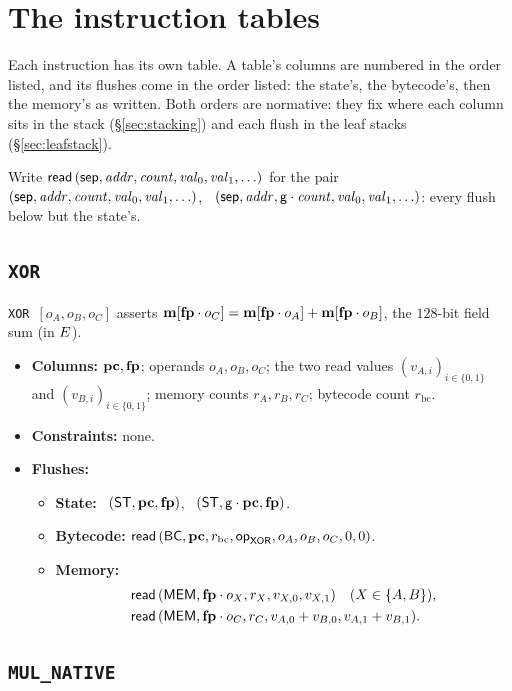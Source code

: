 \section{The instruction tables}\label{sec:tables}

Each instruction has its own table. A table's columns are numbered in the order listed, and its flushes come in the order listed: the state's, the bytecode's, then the memory's as written. Both orders are normative: they fix where each column sits in the stack (\S\ref{sec:stacking}) and each flush in the leaf stacks (\S\ref{sec:leafstack}).

Write $\rdf{\sep,\addr,\cnt,\val_0,\val_1, \dots}$ for the pair \pull\ $\tup{\sep,\addr,\cnt,\val_0,\val_1, \dots }$, \push\ $\tup{\sep,\addr,\gen\cdot\cnt,\val_0,\val_1, \dots}$: every flush below but the state's.

\subsection{\texttt{XOR}}\label{sec:tab-xor}

\texttt{XOR}\ $[o_A,o_B,o_C]$ asserts $\mathbf{m}[\mathbf{fp}\cdot o_C]=\mathbf{m}[\mathbf{fp}\cdot o_A]+\mathbf{m}[\mathbf{fp}\cdot o_B]$, the $128$-bit field sum (in $E$).
\begin{itemize}
\item \textbf{Columns:} $\mathbf{pc},\mathbf{fp}$; operands $o_A,o_B,o_C$; the two read values $(v_{A,i})_{i\in\{0,1\}}$ and $(v_{B,i})_{i\in\{0,1\}}$; memory counts $r_A,r_B,r_C$; bytecode count $r_{\mathrm{bc}}$.
\item \textbf{Constraints:} none.
\item \textbf{Flushes:}
  \begin{itemize}
  \item \textbf{State:} \pull\ $( \mathsf{ST},\mathbf{pc},\mathbf{fp} )$, \push\ $( \mathsf{ST},\mathsf{g}\cdot\mathbf{pc},\mathbf{fp} )$.
  \item \textbf{Bytecode:} $\mathsf{read}\,( \mathsf{BC},\mathbf{pc},r_{\mathrm{bc}},\mathsf{op}_{\mathsf{XOR}},o_A,o_B,o_C,0,0 )$.
  \item \textbf{Memory:}
    \begin{align*}
      &\mathsf{read}\,( \mathsf{MEM},\mathbf{fp}\cdot o_X,r_X,v_{X,0},v_{X,1} )\quad(X\in\{A,B\}),\\
      &\mathsf{read}\,( \mathsf{MEM},\mathbf{fp}\cdot o_C,r_C,v_{A,0}+v_{B,0},v_{A,1}+v_{B,1} ).
    \end{align*}
  \end{itemize}
\end{itemize}

\subsection{\texttt{MUL\_NATIVE}}\label{sec:tab-mul}

